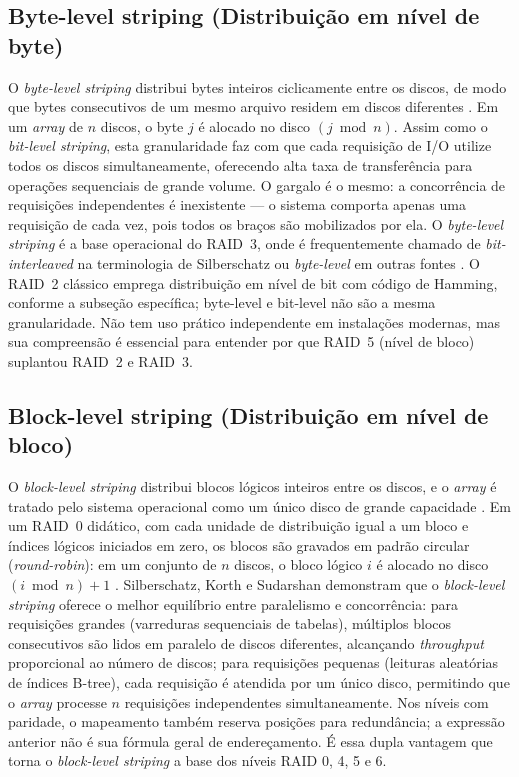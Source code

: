 \documentclass[titlepage]{article}
\begin{document}
\subsection{Byte-level striping (Distribuição em nível de byte)}
O \textit{byte-level striping} distribui bytes inteiros ciclicamente entre os discos, de modo que bytes consecutivos de um mesmo arquivo residem em discos diferentes \cite{silberschatz2020,garciamolina2009}. Em um \textit{array} de $n$ discos, o byte $j$ é alocado no disco $(j \bmod n)$. Assim como o \textit{bit-level striping}, esta granularidade faz com que cada requisição de I/O utilize todos os discos simultaneamente, oferecendo alta taxa de transferência para operações sequenciais de grande volume. O gargalo é o mesmo: a concorrência de requisições independentes é inexistente --- o sistema comporta apenas uma requisição de cada vez, pois todos os braços são mobilizados por ela. O \textit{byte-level striping} é a base operacional do RAID~3, onde é frequentemente chamado de \textit{bit-interleaved} na terminologia de Silberschatz ou \textit{byte-level} em outras fontes \cite{elmasri2016}. O RAID~2 clássico emprega distribuição em nível de bit com código de Hamming, conforme a subseção específica; byte-level e bit-level não são a mesma granularidade. Não tem uso prático independente em instalações modernas, mas sua compreensão é essencial para entender por que RAID~5 (nível de bloco) suplantou RAID~2 e RAID~3.

\subsection{Block-level striping (Distribuição em nível de bloco)}
O \textit{block-level striping} distribui blocos lógicos inteiros entre os discos, e o \textit{array} é tratado pelo sistema operacional como um único disco de grande capacidade \cite{silberschatz2020}. Em um RAID~0 didático, com cada unidade de distribuição igual a um bloco e índices lógicos iniciados em zero, os blocos são gravados em padrão circular (\textit{round-robin}): em um conjunto de $n$ discos, o bloco lógico $i$ é alocado no disco $(i \bmod n) + 1$ \cite{silberschatz2020}. Silberschatz, Korth e Sudarshan \cite{silberschatz2020} demonstram que o \textit{block-level striping} oferece o melhor equilíbrio entre paralelismo e concorrência: para requisições grandes (varreduras sequenciais de tabelas), múltiplos blocos consecutivos são lidos em paralelo de discos diferentes, alcançando \textit{throughput} proporcional ao número de discos; para requisições pequenas (leituras aleatórias de índices B-tree), cada requisição é atendida por um único disco, permitindo que o \textit{array} processe $n$ requisições independentes simultaneamente. Nos níveis com paridade, o mapeamento também reserva posições para redundância; a expressão anterior não é sua fórmula geral de endereçamento. É essa dupla vantagem que torna o \textit{block-level striping} a base dos níveis RAID 0, 4, 5 e 6.
\end{document}
